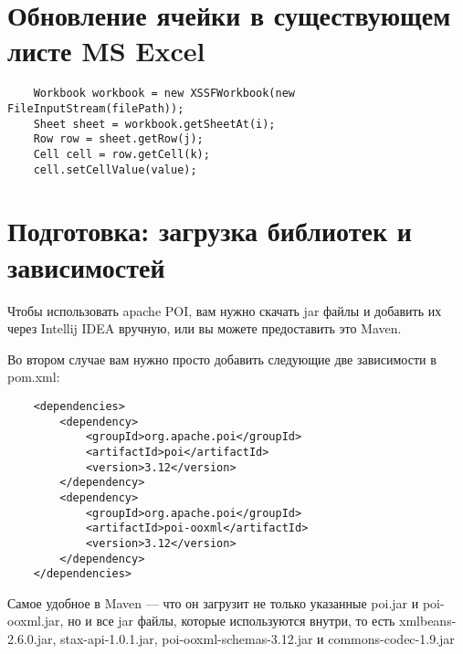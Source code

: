 \section{Обновление ячейки в существующем листе MS Excel}

\begin{lstlisting}
	Workbook workbook = new XSSFWorkbook(new FileInputStream(filePath));
	Sheet sheet = workbook.getSheetAt(i);
	Row row = sheet.getRow(j);
	Cell cell = row.getCell(k);
	cell.setCellValue(value);
\end{lstlisting}

\section{Подготовка: загрузка библиотек и зависимостей}

Чтобы использовать apache POI, вам нужно скачать jar файлы и добавить их через Intellij IDEA вручную, или вы можете предоставить это Maven.

Во втором случае вам нужно просто добавить следующие две зависимости в pom.xml:

\lstset{language=xml}

\begin{lstlisting}
	<dependencies>
		<dependency>
			<groupId>org.apache.poi</groupId>
			<artifactId>poi</artifactId>
			<version>3.12</version>
		</dependency>
		<dependency>
			<groupId>org.apache.poi</groupId>
			<artifactId>poi-ooxml</artifactId>
			<version>3.12</version>
		</dependency>
	</dependencies>
\end{lstlisting}

Самое удобное в Maven — что он загрузит не только указанные poi.jar и poi-ooxml.jar, но и все jar файлы, которые используются внутри, то есть xmlbeans-2.6.0.jar, 
stax-api-1.0.1.jar, poi-ooxml-schemas-3.12.jar и commons-codec-1.9.jar
